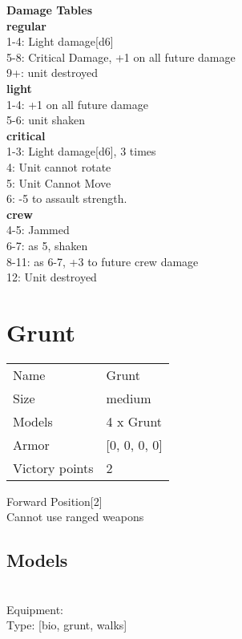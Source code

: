 {\bf Damage Tables} \\
 {\bf regular } \\
1-4: Light damage[d6] \\
5-8: Critical Damage, +1 on all future damage \\
9+: unit destroyed \\
 {\bf light } \\
1-4: +1 on all future damage \\
5-6: unit shaken \\
 {\bf critical } \\
1-3: Light damage[d6], 3 times \\
4: Unit cannot rotate \\
5: Unit Cannot Move \\
6: -5 to assault strength. \\
 {\bf crew } \\
4-5: Jammed \\
6-7: as 5, shaken \\
8-11: as 6-7, +3 to future crew damage \\
12: Unit destroyed \\










\pagebreak\pagebreak

\section{ Grunt }

\begin{tabular}{ll}
  Name & Grunt \\
  Size & medium\\
  Models & 4 x Grunt\\
  Armor & [0, 0, 0, 0]\\
  Victory points & 2\\
\end{tabular}

Forward Position[2]\\ 
Cannot use ranged weapons\\ 


\subsection{ Models }

 \\
Equipment:  \\
Type: [bio, grunt, walks] \\

